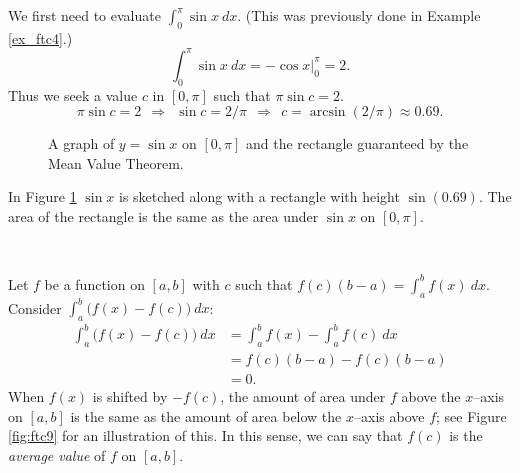 \begin{solution}
{We first need to evaluate $\int_0^\pi \sin x\ dx$. (This was previously done in Example \ref{ex_ftc4}.)
		$$\int_0^\pi\sin x\ dx =	-\cos x \Big|_0^\pi = 2.$$
Thus we seek a value $c$ in $[0,\pi]$ such that $\pi\sin c =2$. 
$$\pi\sin c = 2\ \ \Rightarrow\ \ \sin c = 2/\pi\ \ \Rightarrow\ \ c = \arcsin(2/\pi) \approx 0.69.$$

\begin{figure}[H]
\caption{A graph of $y=\sin x$ on $[0,\pi]$ and the rectangle guaranteed by the Mean Value Theorem. \label{fig:ftc8}} 
\end{figure}


In Figure \ref{fig:ftc8} $\sin x$ is sketched along with a rectangle with height $\sin (0.69)$. The area of the rectangle is the same as the area under $\sin x$ on $[0,\pi]$.
}\\
\end{solution}

Let $f$ be a function on $[a,b]$ with $c$ such that $f(c)(b-a) = \int_a^bf(x)\ dx$. Consider $\int_a^b\big(f(x)-f(c)\big)\ dx$:
\begin{align*}
	\int_a^b\big(f(x)-f(c)\big)\ dx &=	\int_a^b f(x) - \int_a^b f(c)\ dx\\
							&= f(c)(b-a) - f(c)(b-a) \\
							&= 0.
\end{align*}
When $f(x)$ is shifted by $-f(c)$, the amount of area under $f$ above the $x$--axis on $[a,b]$ is the same as the amount of area below the $x$--axis above $f$; see Figure \ref{fig:ftc9} for an illustration of this. In this sense, we can say that $f(c)$ is the \textit{average value} of $f$ on $[a,b]$. 






